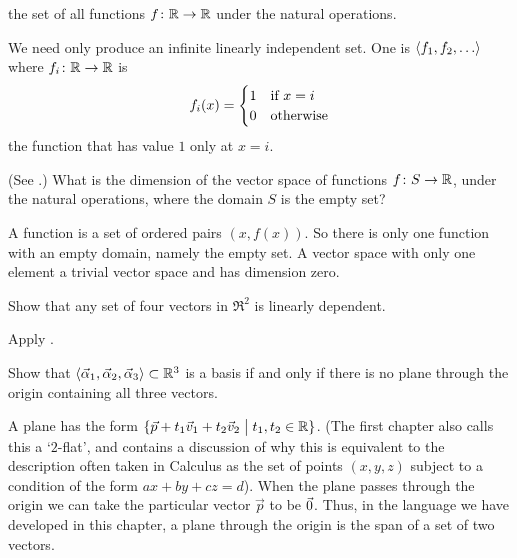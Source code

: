 \begin{exercises}
    the set of all functions \( \mbox{$f\colon \mathbb{R}\to \mathbb{R}$} \) under the natural
    operations.
    \begin{answer}
      We need only produce an infinite linearly independent set.
      One is \( \langle f_1,f_2,\ldots\rangle \) where
      \( \mbox{$f_i\colon \mathbb{R}\to \mathbb{R}$} \) is
      \begin{equation*}
         f_i(x)=\begin{cases}
                   1  &\text{if \( x=i \)}  \\
                   0  &\text{otherwise}
                \end{cases}
      \end{equation*}  
      the function that has value $1$ only at $x=i$.
    \end{answer}
  \item  
    (See .)
    What is the dimension of the vector space of functions
    $\mbox{$f\colon S\to \mathbb{R}$}$, under the natural operations, where the
    domain $S$ is the empty set?
    \begin{answer}
      A function is a set of ordered pairs
      $(x,f(x))$.
      So there is only one function with an empty domain, namely the empty set.
      A vector space with only one element a trivial vector space 
      and has dimension zero.
    \end{answer}
  \item  
    Show that 
    any set of four vectors in \( \Re^2 \) is linearly dependent.
    \begin{answer}
      Apply .
    \end{answer}
  \item  
    Show that
    \( \langle\vec{\alpha}_1,\vec{\alpha}_2,\vec{\alpha}_3\rangle\subset\mathbb{R}^3 \)
    is a basis if and only if there is no plane through the origin containing
    all three vectors.
    \begin{answer}
      A plane has the
      form $\mbox{$\{\vec{p}+t_1\vec{v}_1+t_2\vec{v}_2\bigm| t_1,t_2\in\mathbb{R}\}$}$.
      (The first chapter also calls this a `$2$-flat', and contains
      a discussion of why this is equivalent to the
      description often taken in Calculus as the set of points $(x,y,z)$
      subject to a condition of the form $ax+by+cz=d$).
      When the plane passes through the origin we can take the particular
      vector $\vec{p}$ to be $\vec{0}$.
      Thus, in the language we have developed in this chapter, a plane through
      the origin is the span of a set of two vectors.


\end{answer}
\end{exercises}
